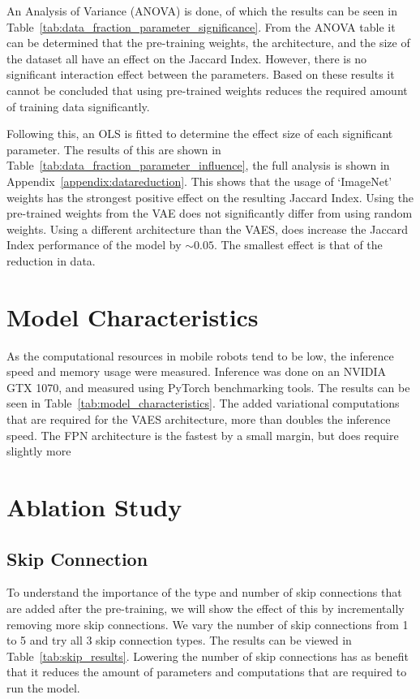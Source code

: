An Analysis of Variance (ANOVA) is done, of which the results can be seen in Table~\ref{tab:data_fraction_parameter_significance}. From the ANOVA table it can be determined that the pre-training weights, the architecture, and the size of the dataset all have an effect on the Jaccard Index. However, there is no significant interaction effect between the parameters. Based on these results it cannot be concluded that using pre-trained weights reduces the required amount of training data significantly.

Following this, an OLS is fitted to determine the effect size of each significant parameter. The results of this are shown in Table~\ref{tab:data_fraction_parameter_influence}, the full analysis is shown in Appendix~\ref{appendix:datareduction}. This shows that the usage of `ImageNet' weights has the strongest positive effect on the resulting Jaccard Index. Using the pre-trained weights from the VAE does not significantly differ from using random weights. Using a different architecture than the VAES, does increase the Jaccard Index performance of the model by $\sim0.05$. The smallest effect is that of the reduction in data.



\section{Model Characteristics}

As the computational resources in mobile robots tend to be low, the inference speed and memory usage were measured. Inference was done on an NVIDIA GTX 1070, and measured using PyTorch benchmarking tools. The results can be seen in Table~\ref{tab:model_characteristics}. The added variational computations that are required for the VAES architecture, more than doubles the inference speed. The FPN architecture is the fastest by a small margin, but does require slightly more 




\section{Ablation Study}

\subsection{Skip Connection}
To understand the importance of the type and number of skip connections that are added after the pre-training, we will show the effect of this by incrementally removing more skip connections. We vary the number of skip connections from 1 to 5 and try all 3 skip connection types. The results can be viewed in Table~\ref{tab:skip_results}. Lowering the number of skip connections has as benefit that it reduces the amount of parameters and computations that are required to run the model.


